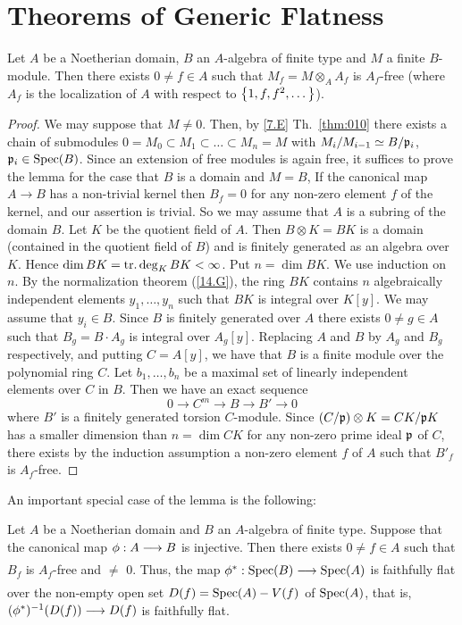 \documentclass[../main]{subfiles}
\begin{document}
\section{Theorems of Generic Flatness}\label{sec:22}

\begin{parlemma}
\label{lem:22.01}
    Let $A$ be a Noetherian domain, $B$ an $A$-algebra of finite type and $M$ a finite $B$-module. Then there exists $0\neq f \in A$ such that $M_f = M\otimes_A A_f$ is $A_f$-free (where $A_f$ is the localization of $A$ with respect to $\left\{1, f, f^2, \dots\right\}$). 
\end{parlemma}
\begin{proof}
    We may suppose that $M \neq 0$. Then, by \ref{7.E} Th.~\ref{thm:010} there exists a chain of submodules $0=M_0\subset M_1 \subset \dots \subset M_n=M$ with $M_i/M_{i-1}\simeq B/\mathfrak{p}_i$, $\mathfrak{p}_i\in \operatorname{Spec}(B)$. Since an extension of free modules is again free, it suffices to prove the lemma for the case that $B$ is a domain and $M=B$, If the canonical map $A\longrightarrow B$ has a non-trivial kernel then $B_f = 0$ for any non-zero element $f$ of the kernel, and our assertion is trivial. So we may assume that $A$ is a subring of the domain $B$. Let $K$ be the quotient field of $A$. Then $B\otimes K = BK$ is a domain (contained in the quotient field of $B$) and is finitely generated as an algebra over $K$. Hence $\operatorname{dim} BK = \operatorname{tr. deg}_K BK < \infty$. Put $n = \dim BK$. We use induction on $n$. By the normalization theorem (\ref{14.G}), the ring $BK$ contains $n$ algebraically independent elements $y_1, \dots, y_n$ such that $BK$ is integral over $K[y]$. We may assume that $y_i \in B$. Since $B$ is finitely generated over $A$ there exists $0 \neq g \in A$ such that $B_g = B\cdot A_g$ is integral over $A_g[y]$. Replacing $A$ and $B$ by $A_g$ and $B_g$ respectively, and putting $C = A[y]$, we have that $B$ is a finite module over the polynomial ring $C$. Let $b_1, \dots, b_n$ be a maximal set of linearly independent elements over $C$ in $B$. Then we have an exact sequence \[0\longrightarrow C^m\longrightarrow B\longrightarrow B'\longrightarrow 0\] where $B'$ is a finitely generated torsion $C$-module. Since $\left(C/\mathfrak{p}\right)\otimes K = CK/\mathfrak{p}K$ has a smaller dimension than $n=\dim CK$ for any non-zero prime ideal $\mathfrak{p}$ of $C$, there exists by the induction assumption a non-zero element $f$ of $A$ such that ${B'}_f$ is $A_f$-free.
\end{proof}
An important special case of the lemma is the following:
\begin{theorem}
\label{thm:052}
    Let $A$ be a Noetherian domain and $B$ an $A$-algebra of finite type. Suppose that the canonical map $\phi: A\varrightarrow{} B$ is injective. Then there exists $0 \neq f \in A$ such that $B_f$ is $A_f$-free and $\neq$ 0. Thus, the map \newline $\SpecInduced{\phi}: \Spec(B)\varrightarrow{}\Spec(A)$ is faithfully flat over the non-empty open set \newline $D(f) = \operatorname{Spec}(A) - V(f)$ of $\operatorname{Spec}(A)$, that is, $(\SpecInduced{\phi})^{-1}(D(f)) \varrightarrow{} D(f)$ is faithfully flat. 
\end{theorem}
\end{document}
